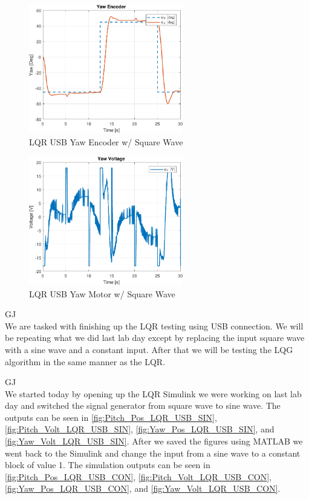 \documentclass[fontsize=11pt, %
                             paper=letter, %
                             openany, %
                             captions=tableheading,
                             index=totoc,
                             hyperref]{labbook}
\begin{document}
\begin{addmargin}[0cm]{0cm}
\begin{figure}[h]
  \centering
  \includegraphics[width=0.6\textwidth]{figs/matlab/LQR/P_USB/Yaw_Pos_LQR_USB_SQU}
  \caption{LQR USB Yaw Encoder w/ Square Wave}
  \label{fig:Yaw_Pos_LQR_USB_SQU}
\end{figure}

\begin{figure}[h]
  \centering
  \includegraphics[width=0.6\textwidth]{figs/matlab/LQR/P_USB/Yaw_Volt_LQR_USB_SQU}
  \caption{LQR USB Yaw Motor w/ Square Wave}
  \label{fig:Yaw_Volt_LQR_USB_SQU}
\end{figure}


GJ\\
We are tasked with finishing up the LQR testing using USB connection.  We will be repeating what we did last lab day except by replacing the input square wave with a sine wave and a constant input.  After that we will be testing the LQG algorithm in the same manner as the LQR.

GJ\\
We started today by opening up the LQR Simulink we were working on last lab day and switched the signal generator from square wave to sine wave.  The outputs can be seen in \autoref{fig:Pitch_Pos_LQR_USB_SIN}, \autoref{fig:Pitch_Volt_LQR_USB_SIN}, \autoref{fig:Yaw_Pos_LQR_USB_SIN}, and \autoref{fig:Yaw_Volt_LQR_USB_SIN}.  After we saved the figures using MATLAB we went back to the Simulink and change the input from a sine wave to a constant block of value 1.  The simulation outputs can be seen in \autoref{fig:Pitch_Pos_LQR_USB_CON}, \autoref{fig:Pitch_Volt_LQR_USB_CON}, \autoref{fig:Yaw_Pos_LQR_USB_CON}, and \autoref{fig:Yaw_Volt_LQR_USB_CON}.


\end{addmargin}
\end{document}
